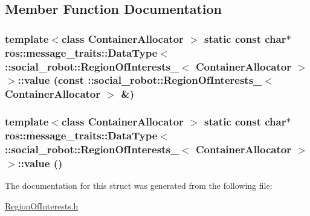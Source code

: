 \subsection{Member Function Documentation}
\hypertarget{structros_1_1message__traits_1_1DataType_3_01_1_1social__robot_1_1RegionOfInterests___3_01ContainerAllocator_01_4_01_4_ad68d4a33929956d4bfd594ac494a581e}{
\subsubsection[{value}]{\setlength{\rightskip}{0pt plus 5cm}template$<$class ContainerAllocator $>$ static const char$\ast$ ros::message\_\-traits::DataType$<$ ::{\bf social\_\-robot::RegionOfInterests\_\-}$<$ ContainerAllocator $>$ $>$::value (const ::{\bf social\_\-robot::RegionOfInterests\_\-}$<$ ContainerAllocator $>$ \&)}}
\label{structros_1_1message__traits_1_1DataType_3_01_1_1social__robot_1_1RegionOfInterests___3_01ContainerAllocator_01_4_01_4_ad68d4a33929956d4bfd594ac494a581e}
\hypertarget{structros_1_1message__traits_1_1DataType_3_01_1_1social__robot_1_1RegionOfInterests___3_01ContainerAllocator_01_4_01_4_af18cebf248ea6052db090fe303643fa8}{
\subsubsection[{value}]{\setlength{\rightskip}{0pt plus 5cm}template$<$class ContainerAllocator $>$ static const char$\ast$ ros::message\_\-traits::DataType$<$ ::{\bf social\_\-robot::RegionOfInterests\_\-}$<$ ContainerAllocator $>$ $>$::value ()}}
\label{structros_1_1message__traits_1_1DataType_3_01_1_1social__robot_1_1RegionOfInterests___3_01ContainerAllocator_01_4_01_4_af18cebf248ea6052db090fe303643fa8}


The documentation for this struct was generated from the following file:\begin{DoxyCompactItemize}
\item 
\hyperlink{RegionOfInterests_8h}{RegionOfInterests.h}\end{DoxyCompactItemize}
